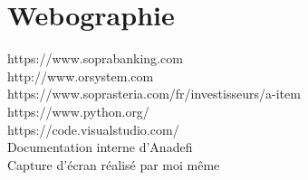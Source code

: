 \section*{Webographie}


https://www.soprabanking.com\\
http://www.orsystem.com\\
https://www.soprasteria.com/fr/investisseurs/a-item\\
https://www.python.org/\\
https://code.visualstudio.com/\\
Documentation interne d'Anadefi\\
Capture d'écran réalisé par moi même\\




